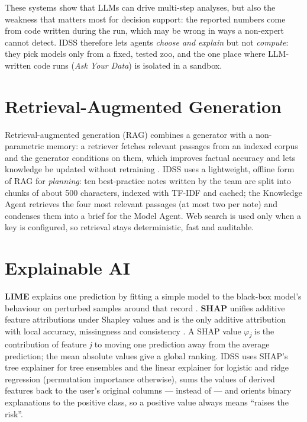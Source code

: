 These systems show that LLMs can drive multi-step analyses, but also the weakness that matters most for decision support: the reported numbers come from code written during the run, which may be wrong in ways a non-expert cannot detect. IDSS therefore lets agents \textit{choose and explain} but not \textit{compute}: they pick models only from a fixed, tested zoo, and the one place where LLM-written code runs (\textit{Ask Your Data}) is isolated in a sandbox.

\FloatBarrier
\section{Retrieval-Augmented Generation}\label{sec:2.4}

Retrieval-augmented generation (RAG) combines a generator with a non-parametric memory: a retriever fetches relevant passages from an indexed corpus and the generator conditions on them, which improves factual accuracy and lets knowledge be updated without retraining \cite{ref14}. IDSS uses a lightweight, offline form of RAG for \textit{planning}: ten best-practice notes written by the team are split into chunks of about 500 characters, indexed with TF-IDF and cached; the Knowledge Agent retrieves the four most relevant passages (at most two per note) and condenses them into a brief for the Model Agent. Web search is used only when a key is configured, so retrieval stays deterministic, fast and auditable.

\FloatBarrier
\section{Explainable AI}\label{sec:2.5}

\textbf{LIME} explains one prediction by fitting a simple model to the black-box model's behaviour on perturbed samples around that record \cite{ref15}. \textbf{SHAP} unifies additive feature attributions under Shapley values and is the only additive attribution with local accuracy, missingness and consistency \cite{ref10}. A SHAP value \textit{\ensuremath{\varphi}}\textit{\textsubscript{j}} is the contribution of feature \textit{j} to moving one prediction away from the average prediction; the mean absolute values give a global ranking. IDSS uses SHAP's tree explainer for tree ensembles and the linear explainer for logistic and ridge regression (permutation importance otherwise), sums the values of derived features back to the user's original columns ---  instead of  --- and orients binary explanations to the positive class, so a positive value always means ``raises the risk''.

